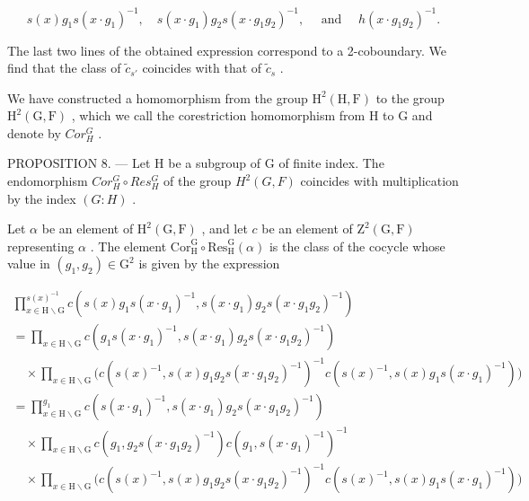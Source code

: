 \[
s (x) g _ {1} s (x \cdot g _ {1}) ^ {- 1}, \quad s (x \cdot g _ {1}) g _ {2} s (x \cdot g _ {1} g _ {2}) ^ {- 1}, \quad \text { and } \quad h (x \cdot g _ {1} g _ {2}) ^ {- 1}.
\]

The last two lines of the obtained expression correspond to a 2-coboundary. We find that the class of \(\widetilde{c}_{s'}\) coincides with that of \(\widetilde{c}_s\) .

We have constructed a homomorphism from the group \(\mathrm{H}^{2}(\mathrm{H},\mathrm{F})\) to the group \(\mathrm{H}^{2}(\mathrm{G},\mathrm{F})\) , which we call the corestriction homomorphism from H to G and denote by \(Cor_{H}^{G}\) .

PROPOSITION 8. --- Let H be a subgroup of G of finite index. The endomorphism \(Cor_{H}^{G} \circ Res_{H}^{G}\) of the group \(H^{2}(G, F)\) coincides with multiplication by the index \((G : H)\) .

Let \(\alpha\) be an element of \(\mathrm{H}^2 (\mathrm{G},\mathrm{F})\) , and let \(c\) be an element of \(\mathrm{Z}^2 (\mathrm{G},\mathrm{F})\) representing \(\alpha\) . The element \(\mathrm{Cor}_{\mathrm{H}}^{\mathrm{G}}\circ \mathrm{Res}_{\mathrm{H}}^{\mathrm{G}}(\alpha)\) is the class of the cocycle whose value in \((g_{1},g_{2})\in \mathrm{G}^{2}\) is given by the expression

\[
\begin{array}{l} \prod_ {x \in \mathrm{H} \backslash \mathrm{G}} ^ {s (x) ^ {- 1}} c (s (x) g _ {1} s (x \cdot g _ {1}) ^ {- 1}, s (x \cdot g _ {1}) g _ {2} s (x \cdot g _ {1} g _ {2}) ^ {- 1}) \\ = \prod_ {x \in \mathrm{H} \backslash \mathrm{G}} c (g _ {1} s (x \cdot g _ {1}) ^ {- 1}, s (x \cdot g _ {1}) g _ {2} s (x \cdot g _ {1} g _ {2}) ^ {- 1}) \\ \quad \times \prod_ {x \in \mathrm{H} \backslash \mathrm{G}} \big (c (s (x) ^ {- 1}, s (x) g _ {1} g _ {2} s (x \cdot g _ {1} g _ {2}) ^ {- 1}) ^ {- 1} c (s (x) ^ {- 1}, s (x) g _ {1} s (x \cdot g _ {1}) ^ {- 1}) \big) \\ = \prod_ {x \in \mathrm{H} \backslash \mathrm{G}} ^ {g _ {1}} c (s (x \cdot g _ {1}) ^ {- 1}, s (x \cdot g _ {1}) g _ {2} s (x \cdot g _ {1} g _ {2}) ^ {- 1}) \\ \quad \times \prod_ {x \in \mathrm{H} \backslash \mathrm{G}} c (g _ {1}, g _ {2} s (x \cdot g _ {1} g _ {2}) ^ {- 1}) c (g _ {1}, s (x \cdot g _ {1}) ^ {- 1}) ^ {- 1} \\ \quad \times \prod_ {x \in \mathrm{H} \backslash \mathrm{G}} \big (c (s (x) ^ {- 1}, s (x) g _ {1} g _ {2} s (x \cdot g _ {1} g _ {2}) ^ {- 1}) ^ {- 1} c (s (x) ^ {- 1}, s (x) g _ {1} s (x \cdot g _ {1}) ^ {- 1}) \big) \end{array}
\]

